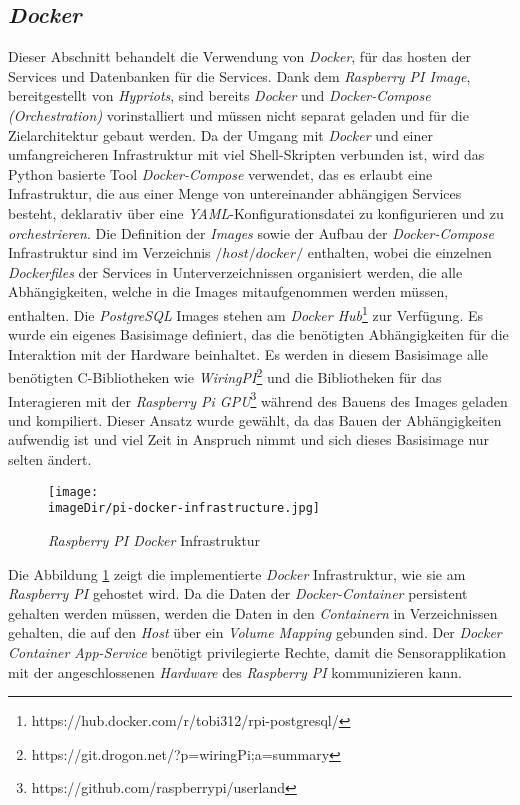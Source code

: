 \subsection{\emph{Docker}}
Dieser Abschnitt behandelt die Verwendung von \emph{Docker}, für das hosten der Services und Datenbanken für die Services. Dank dem \emph{Raspberry PI Image}, bereitgestellt von \emph{Hypriots}, sind bereits \emph{Docker} und \emph{Docker-Compose} \emph{(Orchestration)} vorinstalliert und müssen nicht separat geladen und für die Zielarchitektur gebaut werden.
\newline
\newline
Da der Umgang mit \emph{Docker} und einer umfangreicheren Infrastruktur mit viel Shell-Skripten verbunden ist, wird das Python basierte Tool \emph{Docker-Compose} verwendet, das es erlaubt eine Infrastruktur, die aus einer Menge von untereinander abhängigen Services besteht, deklarativ über eine \emph{YAML}-Konfigurationsdatei zu konfigurieren und zu \emph{orchestrieren}. 
\newline
\newline
Die Definition der \emph{Images} sowie der Aufbau der \emph{Docker-Compose} Infrastruktur sind im Verzeichnis \emph{$/host/docker/$} enthalten, wobei die einzelnen \emph{Dockerfiles} der Services in Unterverzeichnissen organisiert werden, die alle Abhängigkeiten, welche in die Images mitaufgenommen werden müssen, enthalten. Die \emph{PostgreSQL} Images stehen am \emph{Docker Hub}\footnote{https://hub.docker.com/r/tobi312/rpi-postgresql/} zur Verfügung. Es wurde ein eigenes Basisimage definiert, das die benötigten Abhängigkeiten für die Interaktion mit der Hardware beinhaltet. Es werden in diesem Basisimage alle benötigten C-Bibliotheken wie \emph{WiringPI}\footnote{https://git.drogon.net/?p=wiringPi;a=summary} und die Bibliotheken für das Interagieren mit der \emph{Raspberry Pi GPU}\footnote{https://github.com/raspberrypi/userland} während des Bauens des Images geladen und kompiliert. Dieser Ansatz wurde gewählt, da das Bauen der Abhängigkeiten aufwendig ist und viel Zeit in Anspruch nimmt und sich dieses Basisimage nur selten ändert.
\begin{center}
	\begin{figure}[h]
		\centering
		\texttt{[image: \\imageDir/pi-docker-infrastructure.jpg]}
		\caption{\emph{Raspberry PI Docker} Infrastruktur}
		\label{fig:rapsi-docker-infrastructure}
	\end{figure}
\end{center}
Die Abbildung \ref{fig:rapsi-docker-infrastructure} zeigt die implementierte \emph{Docker} Infrastruktur, wie sie am \emph{Raspberry PI} gehostet wird. Da die Daten der \emph{Docker-Container} persistent gehalten werden müssen, werden die Daten in den \emph{Containern} in Verzeichnissen gehalten, die auf den \emph{Host} über ein \emph{Volume Mapping} gebunden sind. Der \emph{Docker Container App-Service} benötigt privilegierte Rechte, damit die Sensorapplikation mit der angeschlossenen \emph{Hardware} des \emph{Raspberry PI} kommunizieren kann. 
